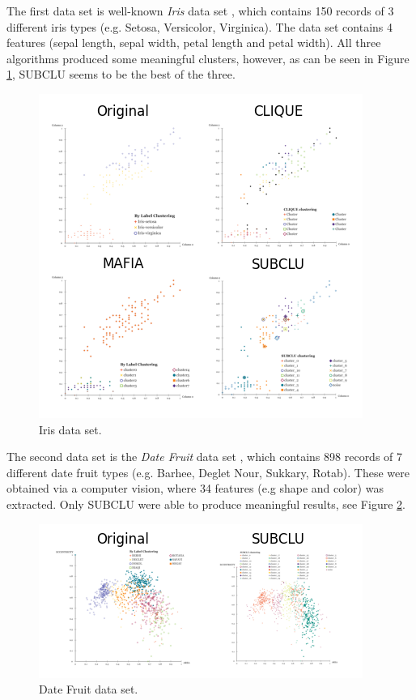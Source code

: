 The first data set is well-known \textit{Iris} data set \cite{iris}, which contains 150 records of 3 different iris types (e.g. Setosa, Versicolor, Virginica). The data set contains 4 features (sepal length, sepal width, petal length and petal width). All three algorithms produced some meaningful clusters, however, as can be seen in Figure \ref{fig:real_world_iris}, SUBCLU seems to be the best of the three.
\begin{figure}
    \centering
    \includegraphics[scale=0.5]{figures/real_world_iris.png}
    \caption{Iris data set.}
    \label{fig:real_world_iris}
\end{figure}

The second data set is the \textit{Date Fruit} data set \cite{date-fruit}, which contains 898 records of 7 different date fruit types (e.g. Barhee, Deglet Nour, Sukkary, Rotab). These were obtained via a computer vision, where 34 features (e.g shape and color) was extracted. Only SUBCLU were able to produce meaningful results, see Figure \ref{fig:real_world_date_fruit}.
\begin{figure}
    \centering
    \includegraphics[scale=0.5]{figures/real_world_date_fruit.png}
    \caption{Date Fruit data set.}
    \label{fig:real_world_date_fruit}
\end{figure}
